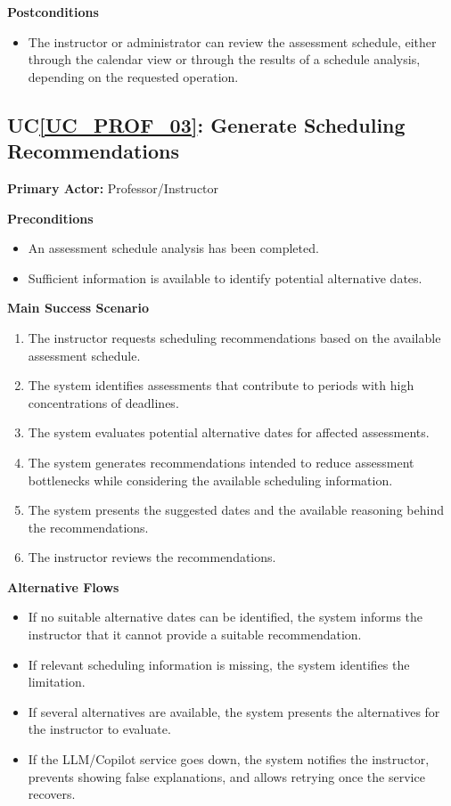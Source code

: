 \documentclass[12pt]{article}
\newcounter{ucnum} %
\newcommand{\ucref}[1]{UC\ref{#1}}
\begin{document}
\noindent \textbf{Postconditions}
\begin{itemize}
  \item The instructor or administrator can review the assessment schedule, either through the calendar view or through the results of a schedule analysis, depending on the requested operation.
\end{itemize}


 \label{UC_PROF_03}
\subsection{\ucref{UC_PROF_03}: Generate Scheduling Recommendations}

\noindent \textbf{Primary Actor:} Professor/Instructor

\noindent \textbf{Preconditions}
\begin{itemize}
  \item An assessment schedule analysis has been completed.
  \item Sufficient information is available to identify potential alternative dates.
\end{itemize}

\noindent \textbf{Main Success Scenario}
\begin{enumerate}
  \item The instructor requests scheduling recommendations based on the available assessment schedule.
  \item The system identifies assessments that contribute to periods with high concentrations of deadlines.
  \item The system evaluates potential alternative dates for affected assessments.
  \item The system generates recommendations intended to reduce assessment bottlenecks while considering the available scheduling information.
  \item The system presents the suggested dates and the available reasoning behind the recommendations.
  \item The instructor reviews the recommendations.
\end{enumerate}

\noindent \textbf{Alternative Flows}
\begin{itemize}
  \item If no suitable alternative dates can be identified, the system informs the instructor that it cannot provide a suitable recommendation.
  \item If relevant scheduling information is missing, the system identifies the limitation.
  \item If several alternatives are available, the system presents the alternatives for the instructor to evaluate.
  \item If the LLM/Copilot service goes down, the system notifies the instructor, prevents showing false explanations, and allows retrying once the service recovers.
\end{itemize}
\end{document}
